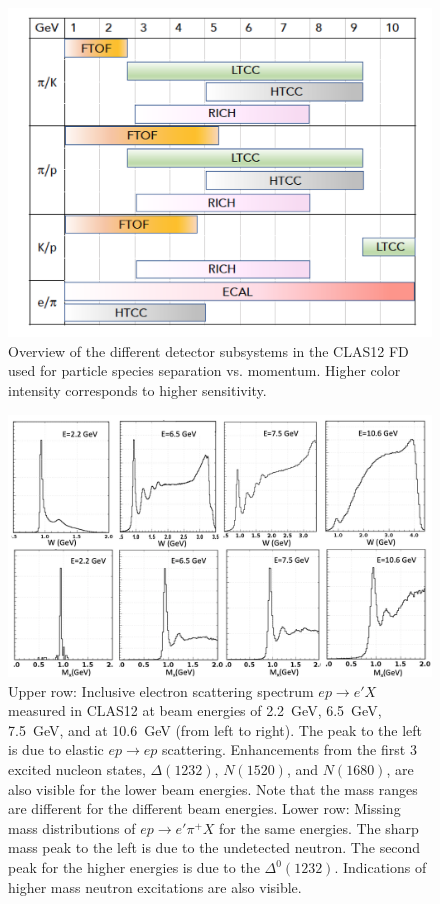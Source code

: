 \documentclass[final,3p]{elsarticle}
\begin{document}
\begin{twocolumn}
\begin{figure}[htp!]
\centerline{\includegraphics[width=1.0\columnwidth]{CLAS12-pid.png}}
\caption{Overview of the different detector subsystems in the CLAS12 FD used for particle species separation
  vs. momentum. Higher color intensity corresponds to higher sensitivity.}
\label{pid1}
\end{figure} 

\begin{figure}[t!]
\centerline{\includegraphics[width=2.0\columnwidth]{W-spectrum.png}}
\caption{Upper row: Inclusive electron scattering spectrum $ep \to e' X$ measured in CLAS12 at beam energies 
  of 2.2~GeV, 6.5~GeV, 7.5~GeV, and at 10.6~GeV (from left to right). The peak to the left is due to elastic
  $ep \to ep$ scattering. Enhancements from the first 3 excited nucleon states, $\Delta(1232)$, $N(1520)$,
  and $N(1680)$, are also visible for the lower beam energies. Note that the mass ranges  are different for the
  different beam energies. Lower row: Missing mass distributions of $ep\to e' \pi^+X$ for the same energies. The
  sharp mass peak to the left is due to the undetected neutron. The second peak for the higher energies is due to
  the $\Delta^0(1232)$. Indications of higher mass neutron excitations are also visible.} 
\label{spectrum}
\end{figure} 


\end{twocolumn}
\end{document}

